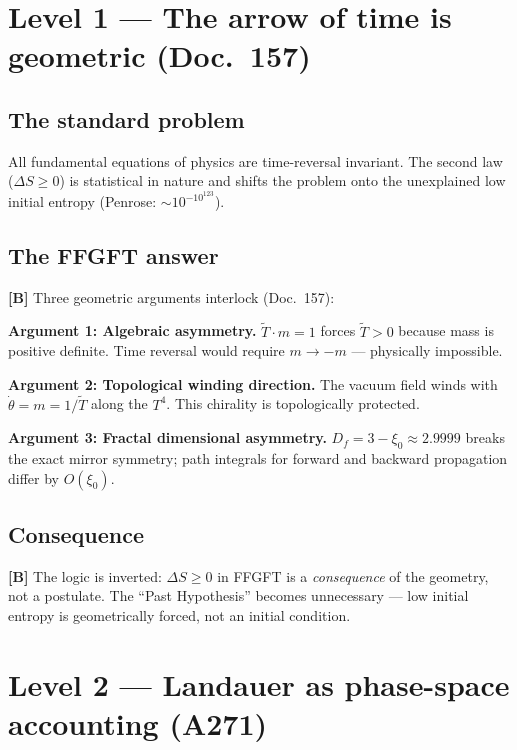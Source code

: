 \section{Level 1 --- The arrow of time is geometric (Doc.~157)}

\subsection{The standard problem}

All fundamental equations of physics are time-reversal invariant.
The second law ($\Delta S \ge 0$) is statistical in nature and shifts
the problem onto the unexplained low initial entropy
(Penrose: $\sim 10^{-10^{123}}$).

\subsection{The FFGFT answer}

\textbf{[B]} Three geometric arguments interlock (Doc.~157):

\textbf{Argument 1: Algebraic asymmetry.}
$\tilde{T} \cdot m = 1$ forces $\tilde{T} > 0$ because mass is
positive definite. Time reversal would require $m \to -m$ ---
physically impossible.

\textbf{Argument 2: Topological winding direction.}
The vacuum field winds with $\dot\theta = m = 1/\tilde{T}$ along
the $T^4$. This chirality is topologically protected.

\textbf{Argument 3: Fractal dimensional asymmetry.}
$D_f = 3 - \xi_0 \approx 2{.}9999$ breaks the exact mirror symmetry;
path integrals for forward and backward propagation differ by
$O(\xi_0)$.

\subsection{Consequence}

\textbf{[B]} The logic is inverted: $\Delta S \ge 0$ in FFGFT is a
\emph{consequence} of the geometry, not a postulate. The
\enquote{Past Hypothesis} becomes unnecessary --- low initial entropy
is geometrically forced, not an initial condition.

\section{Level 2 --- Landauer as phase-space accounting (A271)}

